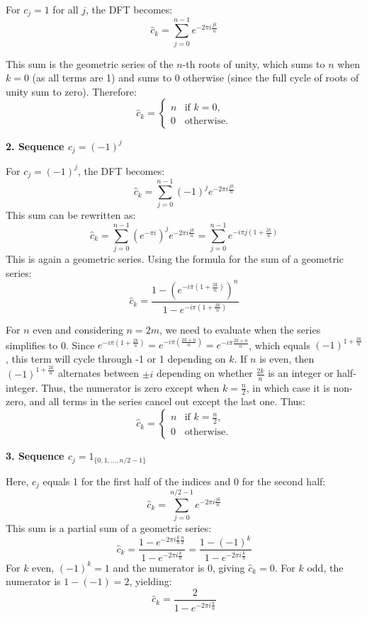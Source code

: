 \documentclass[8pt]{article}
\begin{document}
{For \( c_j = 1 \) for all \( j \), the DFT becomes:
\[
\hat{c}_k = \sum_{j=0}^{n-1} e^{-2\pi i \frac{jk}{n}}
\]

This sum is the geometric series of the \( n \)-th roots of unity, which sums to \( n \) when \( k = 0 \) (as all terms are 1) and sums to 0 otherwise (since the full cycle of roots of unity sum to zero). Therefore:
\[
\hat{c}_k = 
\begin{cases} 
n & \text{if } k = 0, \\
0 & \text{otherwise}.
\end{cases}
\]

\textbf{2. Sequence \( c_j = (-1)^j \)}

For \( c_j = (-1)^j \), the DFT becomes:
\[
\hat{c}_k = \sum_{j=0}^{n-1} (-1)^j e^{-2\pi i \frac{jk}{n}}
\]
This sum can be rewritten as:
\[
\hat{c}_k = \sum_{j=0}^{n-1} (e^{-\pi i})^j e^{-2\pi i \frac{jk}{n}} = \sum_{j=0}^{n-1} e^{-i\pi j(1 + \frac{2k}{n})}
\]
This is again a geometric series. Using the formula for the sum of a geometric series:
\[
\hat{c}_k = \frac{1 - (e^{-i\pi (1 + \frac{2k}{n})})^n}{1 - e^{-i\pi (1 + \frac{2k}{n})}}
\]

For \( n \) even and considering \( n = 2m \), we need to evaluate when the series simplifies to 0. Since \( e^{-i\pi (1 + \frac{2k}{n})} = e^{-i\pi (\frac{2k+n}{n})} = e^{-i\pi \frac{2k+n}{n}} \), which equals \( (-1)^{1+\frac{2k}{n}} \), this term will cycle through -1 or 1 depending on \( k \). If \( n \) is even, then \( (-1)^{1+\frac{2k}{n}} \) alternates between \( \pm i \) depending on whether \( \frac{2k}{n} \) is an integer or half-integer. Thus, the numerator is zero except when \( k = \frac{n}{2} \), in which case it is non-zero, and all terms in the series cancel out except the last one. Thus:
\[
\hat{c}_k = 
\begin{cases} 
n & \text{if } k = \frac{n}{2}, \\
0 & \text{otherwise}.
\end{cases}
\]

\textbf{3. Sequence \( c_j = 1_{\{0,1,\ldots,n/2-1\}} \)}

Here, \( c_j \) equals 1 for the first half of the indices and 0 for the second half:
\[
\hat{c}_k = \sum_{j=0}^{n/2-1} e^{-2\pi i \frac{jk}{n}}
\]
This sum is a partial sum of a geometric series:
\[
\hat{c}_k = \frac{1 - e^{-2\pi i \frac{k}{n} \frac{n}{2}}}{1 - e^{-2\pi i \frac{k}{n}}} = \frac{1 - (-1)^k}{1 - e^{-2\pi i \frac{k}{n}}}
\]
For \( k \) even, \( (-1)^k = 1 \) and the numerator is 0, giving \( \hat{c}_k = 0 \). For \( k \) odd, the numerator is \( 1 - (-1) = 2 \), yielding:
\[
\hat{c}_k = \frac{2}{1 - e^{-2\pi i \frac{k}{n}}}
\]

}
\end{document}
